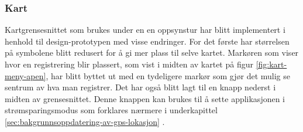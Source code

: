 \subsubsection{Kart}
Kartgrensesnittet som brukes under en en oppsynstur har blitt implementert i henhold til design-prototypen med visse endringer. For det første har størrelsen på symbolene blitt redusert for å gi mer plass til selve kartet. Markøren som viser hvor en registrering blir plassert, som vist i midten av kartet på figur \ref{fig:kart-meny-apen}, har blitt byttet ut med en tydeligere markør som gjør det mulig se sentrum av hva man registrer. Det har også blitt lagt til en knapp nederst i midten av grensesnittet. Denne knappen kan brukes til å sette applikasjonen i strømsparingsmodus som forklares nærmere i underkapittel \ref{sec:bakgrunnsoppdatering-av-gps-lokasjon} .

